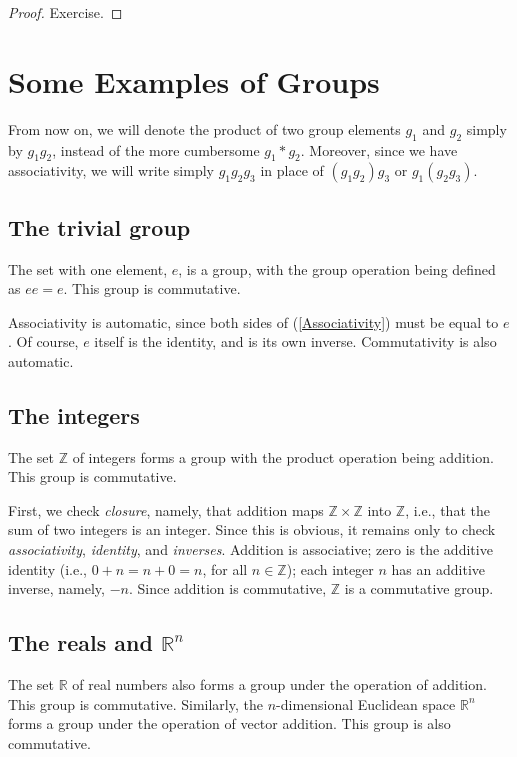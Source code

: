 \documentclass[12pt]{amsbook}
\theoremstyle{plain}
\numberwithin{equation}{chapter}
\numberwithin{theorem}{chapter}
\begin{document}
\begin{proof}
Exercise.
\end{proof}

\section{Some Examples of Groups\label{ex}}

From now on, we will denote the product of two group elements $g_{1}$ and
$g_{2}$ simply by $g_{1}g_{2}$, instead of the more cumbersome $g_{1}\ast
g_{2}$. Moreover, since we have associativity, we will write simply
$g_{1}g_{2}g_{3}$ in place of $(g_{1}g_{2})g_{3}$ or $g_{1}(g_{2}g_{3})$.

\subsection{The trivial group}

The set with one element, $e$, is a group, with the group operation being
defined as $ee=e$. This group is commutative.

Associativity is automatic, since both sides of (\ref{Associativity}) must be
equal to $e$. Of course, $e$ itself is the identity, and is its own inverse.
Commutativity is also automatic.

\subsection{The integers}

The set $\mathbb{Z}$ of integers forms a group with the product operation
being addition. This group is commutative.

First, we check \textit{closure}, namely, that addition maps $\mathbb{Z}%
\times\mathbb{Z}$ into $\mathbb{Z}$, i.e., that the sum of two integers is an
integer. Since this is obvious, it remains only to check
\textit{associativity}, \textit{identity}, and \textit{inverses}. Addition is
associative; zero is the additive identity (i.e., $0+n=n+0=n$, for all
$n\in\mathbb{Z}$); each integer $n$ has an additive inverse, namely, $-n$.
Since addition is commutative, $\mathbb{Z}$ is a commutative group.

\subsection{The reals and $\mathbb{R}^{n}$}

The set $\mathbb{R}$ of real numbers also forms a group under the operation of
addition. This group is commutative. Similarly, the $n$-dimensional Euclidean
space $\mathbb{R}^{n}$ forms a group under the operation of vector addition.
This group is also commutative.
\end{document}

